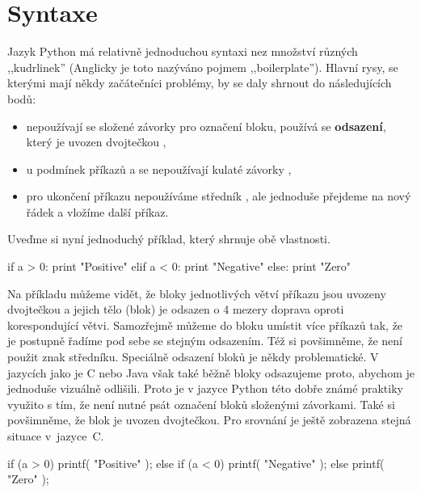 \section{Syntaxe} \label{sec:syntax}

Jazyk Python má relativně jednoduchou syntaxi nez množství různých ,,kudrlinek'' (Anglicky je toto nazýváno pojmem
,,boilerplate''). Hlavní rysy, se kterými mají někdy začátečníci problémy, by se daly shrnout do následujících bodů:

\begin{itemize}
    \item nepoužívají se složené závorky \kod{\{} \kod{\}} pro označení bloku,
          používá se \textbf{odsazení}, který je uvozen dvojtečkou \kod{:},
    \item u podmínek příkazů  a  se nepoužívají kulaté závorky \kod{(} \kod{)},
    \item pro ukončení příkazu nepoužíváme středník \kod{;}, ale jednoduše přejdeme na nový řádek a vložíme další příkaz.
\end{itemize}

Uveďme si nyní jednoduchý příklad, který shrnuje obě vlastnosti.

\begin{python}
if a > 0:
    print "Positive"
elif a < 0:
    print "Negative"
else:
    print "Zero"
\end{python}
Na příkladu můžeme vidět, že bloky jednotlivých větví příkazu  jsou uvozeny dvojtečkou a jejich tělo (blok) je
odsazen o 4 mezery doprava oproti korespondující větvi. Samozřejmě můžeme do bloku umístit více příkazů tak, že
je postupně řadíme pod sebe se stejným odsazením. Též si povšimněme, že není použit znak středníku.
Speciálně odsazení bloků je někdy problematické. V jazycích jako je C nebo Java však také běžně bloky odsazujeme
proto, abychom je jednoduše vizuálně odlišili. Proto je v jazyce Python této dobře známé praktiky využito s tím,
že není nutné psát označení bloků složenými závorkami. Také si povšimněme, že blok je uvozen dvojtečkou.
Pro srovnání je ještě zobrazena stejná situace v~jazyce~C.

\begin{python}
if (a > 0) {
    printf( "Positive\n" );
}
else if (a < 0) {
    printf( "Negative\n" );
}
else {
    printf( "Zero\n" );
}
\end{python}

